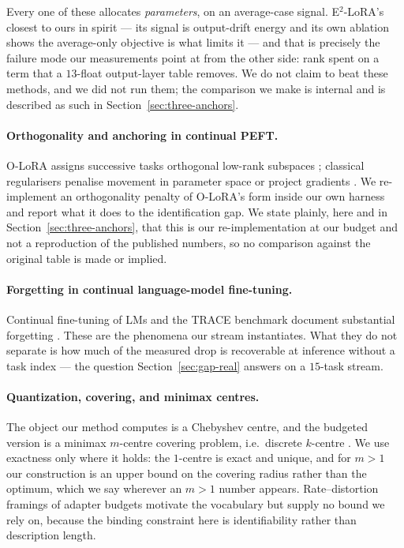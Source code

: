 Every one of these allocates \emph{parameters}, on an average-case signal.
E$^2$-LoRA's closest to ours in spirit --- its signal is output-drift energy and its
own ablation shows the average-only objective is what limits it --- and that is
precisely the failure mode our measurements point at from the other side: rank
spent on a term that a $13$-float output-layer table removes. We do not claim to
beat these methods, and we did not run them; the comparison we make is internal
and is described as such in Section~\ref{sec:three-anchors}.

\paragraph{Orthogonality and anchoring in continual PEFT.}
O-LoRA assigns successive tasks orthogonal low-rank subspaces
\citep{wang2023olora}; classical regularisers penalise movement in parameter
space \citep{kirkpatrick2017ewc} or project gradients
\citep{lopezpaz2017gem,farajtabar2020ogd,saha2021gpm}. We re-implement an
orthogonality penalty of O-LoRA's form inside our own harness and report what it
does to the identification gap. We state plainly, here and in
Section~\ref{sec:three-anchors}, that this is our re-implementation at our budget
and not a reproduction of the published numbers, so no comparison against the
original table is made or implied.

\paragraph{Forgetting in continual language-model fine-tuning.}
Continual fine-tuning of LMs and the TRACE benchmark document substantial
forgetting \citep{luo2023forgetting,wang2023trace}. These are the phenomena our
stream instantiates. What they do not separate is how much of the measured drop is
recoverable at inference without a task index --- the question
Section~\ref{sec:gap-real} answers on a $15$-task stream.

\paragraph{Quantization, covering, and minimax centres.}
The object our method computes is a Chebyshev centre, and the budgeted version is
a minimax $m$-centre covering problem, i.e.\ discrete $k$-centre
\citep{gonzalez1985kcentre,hochbaum1985kcentre}. We use exactness only where it
holds: the $1$-centre is exact and unique, and for $m>1$ our construction is an
upper bound on the covering radius rather than the optimum, which we say wherever
an $m>1$ number appears. Rate--distortion framings of adapter budgets
\citep{shannon1959rate} motivate the vocabulary but supply no bound we rely on,
because the binding constraint here is identifiability rather than description
length.